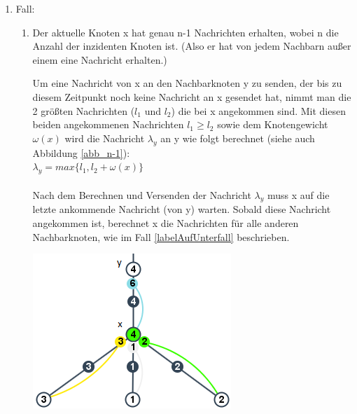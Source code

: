 \begin{enumerate}
			
	\item Fall: \label{paperAlgoFall1}
	
		\begin{enumerate}
			
			\item Der aktuelle Knoten x hat genau n-1 Nachrichten erhalten, wobei n die Anzahl der inzidenten Knoten ist. (Also er hat von jedem Nachbarn außer einem eine Nachricht erhalten.)
			\\
			
				\begin{minipage}{0.50\textwidth} 
					
					Um eine Nachricht von x an den Nachbarknoten y zu senden, der bis zu diesem Zeitpunkt noch keine Nachricht an x gesendet hat, nimmt man die 2 größten Nachrichten ($l_{1}$ und $l_{2}$) die bei x angekommen sind. Mit diesen beiden angekommenen Nachrichten $l_{1} \ge l_{2}$ sowie dem Knotengewicht $\omega(x)$ wird die Nachricht $\lambda_{y}$ an y wie folgt berechnet (siehe auch Abbildung \ref{abb_n-1}):\\
					$\lambda_{y} = max\{l_{1},  l_{2} + \omega(x)\}$
					\\
					\\	
					Nach dem Berechnen und Versenden der Nachricht $\lambda_{y}$ muss x auf die letzte ankommende Nachricht (von y) warten. Sobald diese Nachricht angekommen ist, berechnet x die Nachrichten für alle anderen Nachbarknoten, wie im Fall \ref{labelAufUnterfall} beschrieben. 
				\end{minipage}
				\hfill
				\begin{minipage}{0.35\textwidth}
					
					\includegraphics[width=\textwidth]{bilder/abb_paper_n-1knoten.png}
					\label{abb_n-1}
				\end{minipage}
				

\end{enumerate}
\end{enumerate}
